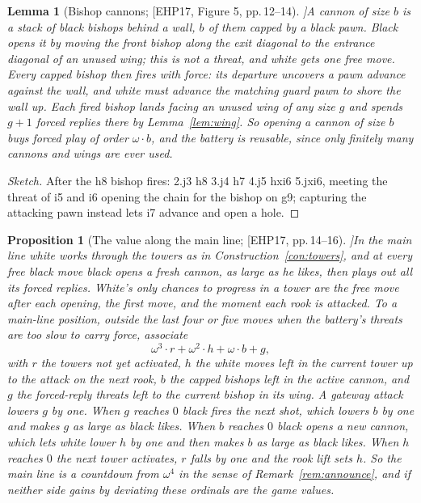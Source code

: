 \documentclass[10pt]{article}
\theoremstyle{notes}
\newtheorem{proposition}[theorem]{Proposition}
\newtheorem{lemma}[theorem]{Lemma}
\newenvironment{sketch}{\begin{proof}[Sketch]\renewcommand{\qedsymbol}{}}{\end{proof}}
\newcommand{\EHP}[1]{[EHP17, #1]}
\begin{document}
\begin{lemma}[Bishop cannons; \EHP{Figure 5, pp.\,12--14}]\label{lem:cannon}
A cannon of size $b$ is a stack of black bishops behind a wall, $b$ of them capped by a black pawn. Black
\emph{opens} it by moving the front bishop along the exit diagonal to the entrance diagonal of an unused
wing; this is not a threat, and white gets one free move. Every capped bishop then \emph{fires} with force:
its departure uncovers a pawn advance against the wall, and white must advance the matching guard pawn to
shore the wall up. Each fired bishop lands facing an unused wing of any size $g$ and spends $g+1$ forced
replies there by Lemma~\ref{lem:wing}. So opening a cannon of size $b$ buys forced play of order
$\omega\cdot b$, and the battery is reusable, since only finitely many cannons and wings are ever used.
\end{lemma}

\begin{sketch}
After the h8 bishop fires: 2.j3 h8 3.j4 h7 4.j5 hxi6 5.jxi6, meeting the threat of i5 and i6 opening the
chain for the bishop on g9; capturing the attacking pawn instead lets i7 advance and open a hole.
\end{sketch}

\begin{proposition}[The value along the main line; \EHP{pp.\,14--16}]\label{prop:formula}
In the main line white works through the towers as in Construction~\ref{con:towers}, and at every free
black move black opens a fresh cannon, as large as he likes, then plays out all its forced replies. White's
only chances to progress in a tower are the free move after each opening, the first move, and the moment each
rook is attacked. To a main-line position, outside the last four or five moves when the battery's threats are
too slow to carry force, associate
\[
  \omega^3\cdot r+\omega^2\cdot h+\omega\cdot b+g,
\]
with $r$ the towers not yet activated, $h$ the white moves left in the current tower up to the attack on the
next rook, $b$ the capped bishops left in the active cannon, and $g$ the forced-reply threats left to the
current bishop in its wing. A gateway attack lowers $g$ by one. When $g$ reaches $0$ black fires the next shot, which lowers $b$ by one
and makes $g$ as large as black likes. When $b$ reaches $0$ black opens a new cannon, which lets white lower
$h$ by one and then makes $b$ as large as black likes. When $h$ reaches $0$ the next tower activates, $r$
falls by one and the rook lift sets $h$. So the main
line is a countdown from $\omega^4$ in the sense of Remark~\ref{rem:announce}, and if neither side
gains by deviating these ordinals are the game values.
\end{proposition}
\end{document}
